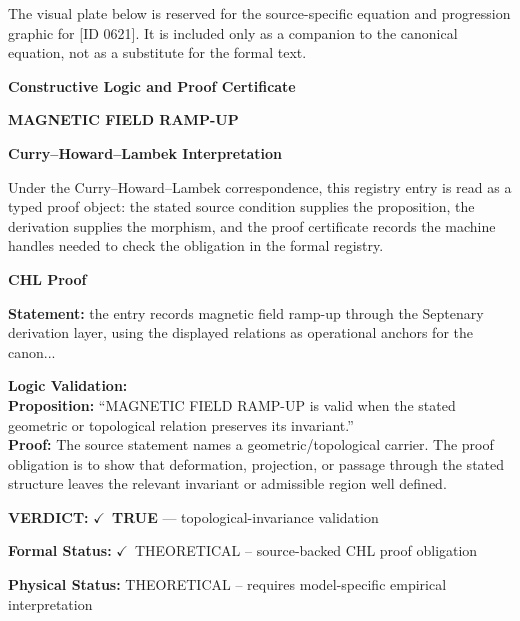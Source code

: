 \begingroup\footnotesize\sloppy
The visual plate below is reserved for the source-specific equation and progression graphic for [ID 0621]. It is included only as a companion to the canonical equation, not as a substitute for the formal text.
\par\endgroup
\ifTZPDarkEdition
{}
\fi

\clearpage
\begingroup\tzpsupportsetup
\noindent\textbf{\fontsize{10.8pt}{12.8pt}\selectfont [ID 0621] Constructive Logic and Proof Certificate}\par
\noindent\textbf{\fontsize{10pt}{12pt}\selectfont MAGNETIC FIELD RAMP-UP}\par
\vspace{0.45em}
\begingroup
\footnotesize
\setlength{\parskip}{0.22em}
\setlength{\parindent}{0pt}
\noindent\textbf{Curry--Howard--Lambek Interpretation}\par
Under the Curry--Howard--Lambek correspondence, this registry entry is read as a typed proof
object: the stated source condition supplies the proposition, the derivation supplies the
morphism, and the proof certificate records the machine handles needed to check the obligation
in the formal registry.

\vspace{0.45em}
\noindent\textbf{CHL Proof}\par
\textbf{Statement:} the entry records magnetic field ramp-up through the Septenary derivation layer, using
the displayed relations as operational anchors for the canon...

\textbf{Logic Validation:}\\
\textbf{Proposition:} ``MAGNETIC FIELD RAMP-UP is valid when the stated geometric or topological relation
preserves its invariant.''\\
\textbf{Proof:} The source statement names a geometric/topological carrier. The proof obligation is to
show that deformation, projection, or passage through the stated structure leaves the
relevant invariant or admissible region well defined.

\textbf{VERDICT:} \ensuremath{\checkmark}\ \textbf{TRUE} --- topological-invariance validation

\textbf{Formal Status:} \ensuremath{\checkmark}\ THEORETICAL -- source-backed CHL proof obligation

\textbf{Physical Status:} THEORETICAL -- requires model-specific empirical interpretation
\par\vspace{0.45em}
\par
\ifTZPDarkEdition
{}
\fi
\endgroup
\endgroup
